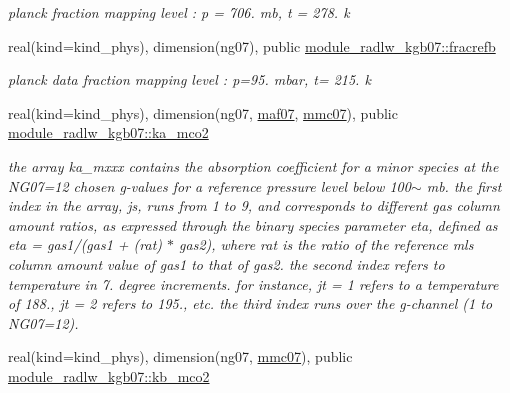 \begin{DoxyCompactItemize}
\begin{DoxyCompactList}\small\item\em planck fraction mapping level \+: p = 706. mb, t = 278. k \end{DoxyCompactList}\item 
\mbox{\label{group__module__radlw__kgbnn_gaa16eb60406e5a298e380b55af528791a}} 
real(kind=kind\+\_\+phys), dimension(ng07), public \hyperlink{group__module__radlw__kgbnn_gaa16eb60406e5a298e380b55af528791a}{module\+\_\+radlw\+\_\+kgb07\+::fracrefb}
\begin{DoxyCompactList}\small\item\em planck data fraction mapping level \+: p=95. mbar, t= 215. k \end{DoxyCompactList}\item 
\mbox{\label{group__module__radlw__kgbnn_ga3fdad494f3d3fcf9306da6a81d97bd43}} 
real(kind=kind\+\_\+phys), dimension(ng07, \hyperlink{group__module__radlw__kgbnn_ga21ac454fe21fb07ee555b4106121b2ae}{maf07}, \hyperlink{group__module__radlw__kgbnn_ga2d176bec938d9fdcc2369fda91308702}{mmc07}), public \hyperlink{group__module__radlw__kgbnn_ga3fdad494f3d3fcf9306da6a81d97bd43}{module\+\_\+radlw\+\_\+kgb07\+::ka\+\_\+mco2}
\begin{DoxyCompactList}\small\item\em the array ka\+\_\+mxxx contains the absorption coefficient for a minor species at the N\+G07=12 chosen g-\/values for a reference pressure level below 100$\sim$ mb. the first index in the array, js, runs from 1 to 9, and corresponds to different gas column amount ratios, as expressed through the binary species parameter eta, defined as eta = gas1/(gas1 + (rat) $\ast$ gas2), where rat is the ratio of the reference mls column amount value of gas1 to that of gas2. the second index refers to temperature in 7. degree increments. for instance, jt = 1 refers to a temperature of 188., jt = 2 refers to 195., etc. the third index runs over the g-\/channel (1 to N\+G07=12). \end{DoxyCompactList}\item 
\mbox{\label{group__module__radlw__kgbnn_ga2dcfbe76332d559cda48c7ba065ab349}} 
real(kind=kind\+\_\+phys), dimension(ng07, \hyperlink{group__module__radlw__kgbnn_ga2d176bec938d9fdcc2369fda91308702}{mmc07}), public \hyperlink{group__module__radlw__kgbnn_ga2dcfbe76332d559cda48c7ba065ab349}{module\+\_\+radlw\+\_\+kgb07\+::kb\+\_\+mco2}

\end{DoxyCompactItemize}
